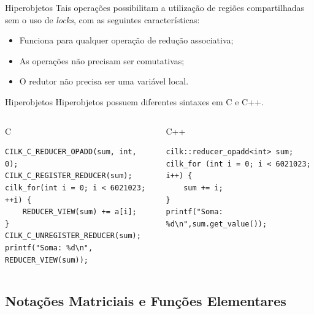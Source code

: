 \documentclass{beamer}
\begin{document}
\begin{frame}[fragile]{Hiperobjetos}
    Tais operações possibilitam a utilização de regiões compartilhadas sem o uso de \textit{locks}, com as seguintes características:
\begin{itemize}
	\item Funciona para qualquer operação de redução associativa;
    \item As operações não precisam ser comutativas;
    \item O redutor não precisa ser uma variável local.
\end{itemize}
\end{frame}

\begin{frame}[fragile]{Hiperobjetos}
    Hiperobjetos possuem diferentes sintaxes em C e C++.
\begin{columns}[T]
\begin{column}{0.4\textwidth}
\begin{tiny}
\begin{block}{C}
\begin{lstlisting}
CILK_C_REDUCER_OPADD(sum, int, 0);
CILK_C_REGISTER_REDUCER(sum);
cilk_for(int i = 0; i < 6021023; ++i) {
    REDUCER_VIEW(sum) += a[i];
}
CILK_C_UNREGISTER_REDUCER(sum);
printf("Soma: %d\n", REDUCER_VIEW(sum));
\end{lstlisting}
\end{block}
\end{tiny}
\end{column}

\begin{column}{0.4\textwidth}

\begin{tiny}
\begin{block}{C++}
\begin{lstlisting}
cilk::reducer_opadd<int> sum;
cilk_for (int i = 0; i < 6021023; i++) {
    sum += i;
}
printf("Soma: %d\n",sum.get_value());
\end{lstlisting}
\end{block}
\end{tiny}

\end{column}
\end{columns}
\end{frame}

\subsection{Notações Matriciais e Funções Elementares}
\end{document}
